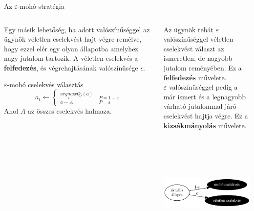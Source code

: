 \documentclass[english, aspectratio=169]{beamer}
\begin{document}
\begin{frame}{Az $\varepsilon$-mohó stratégia}
\begin{columns}
\begin{column}{.5\textwidth}
Egy másik lehetőség, ha adott valószínűséggel az ügynök véletlen cselekvést hajt végre remélve, hogy ezzel elér egy olyan állapotba amelyhez nagy jutalom tartozik. A véletlen cselekvés a \textbf{felfedezés}, és végrehajtásának valószínűsége $\epsilon$.
\begin{center}
\begin{block}{$\varepsilon$-mohó cselekvés választás}
\[
a_{t}\leftarrow\begin{cases}
_{a\sim A}^{\underset{a}{argmax}Q_t(a)} & _{P=\varepsilon}^{P=1-\varepsilon}\end{cases}
\]
Ahol $A$ az összes cselekvés halmaza.
\end{block}
\end{center}
\end{column}
\begin{column}{.5\textwidth}
Az ügynök tehát $\varepsilon$ valószínűséggel véletlen cselekvést választ az ismeretlen, de nagyobb jutalom reményében. Ez a \textbf{felfedezés} művelete.\\
$\varepsilon$ valószínűséggel pedig a már ismert és a legnagyobb várható jutalommal járó cselekvést hajtja végre. Ez a \textbf{kizsákmányolás} művelete.
\begin{center}
\includegraphics[width=7cm, height=6cm, keepaspectratio]{graphs/solving_1.png}
\end{center}
\end{column}
\end{columns}
\end{frame}
\end{document}
